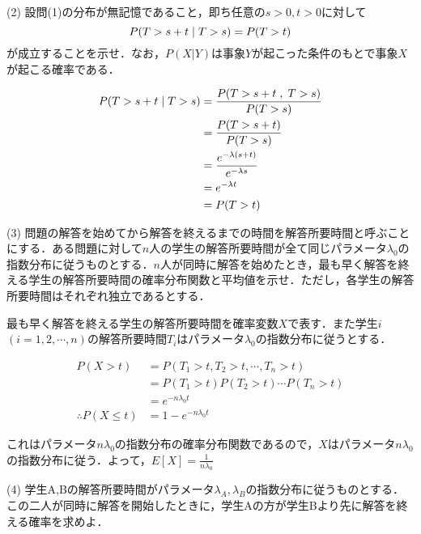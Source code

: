 \documentclass[a4j]{jarticle}
\let \ds \displaystyle
\begin{document}
\begin{screen}
 (2) 設問(1)の分布が無記憶であること，即ち任意の$s>0,t>0$に対して
 $$P(T>s+t \hspace{1mm}|\hspace{1mm} T>s ) = P(T>t)$$
 が成立することを示せ．なお，$P(X|Y)$は事象$Y$が起こった条件のもとで事象$X$が起こる確率である．
\end{screen}

\begin{align*}
 P(T>s+t \hspace{1mm}|\hspace{1mm} T>s ) &= \frac{P(T>s+t \hspace{1mm},\hspace{1mm} T>s )}{P(T>s)} \\
 &= \frac{P(T>s+t)}{P(T>s)} \\
 &= \frac{e^{-\lambda(s+t)}}{e^{-\lambda s}} \\
 &= e^{-\lambda t} \\
 &= P(T>t)
\end{align*}

\begin{screen}
 (3) 問題の解答を始めてから解答を終えるまでの時間を解答所要時間と呼ぶことにする．ある問題に対して$n$人の学生の解答所要時間が全て同じパラメータ$\lambda_0$の指数分布に従うものとする．$n$人が同時に解答を始めたとき，最も早く解答を終える学生の解答所要時間の確率分布関数と平均値を示せ．ただし，各学生の解答所要時間はそれぞれ独立であるとする．
\end{screen}

最も早く解答を終える学生の解答所要時間を確率変数$X$で表す．また学生$i$ $(i=1,2,\cdots,n)$の解答所要時間$T_i$はパラメータ$\lambda_0$の指数分布に従うとする．

\begin{align*}
 P(X > t) &= P(T_1 > t , T_2 > t , \cdots , T_{n} > t) \\
 &= P(T_1 > t)P(T_2 > t)\cdots P(T_{n} > t) \\
 &= e^{-n\lambda_0t} \\
 \therefore P(X \leq t)&=1-e^{-n\lambda_0t}
\end{align*}

これはパラメータ$n\lambda_0$の指数分布の確率分布関数であるので，$X$はパラメータ$n\lambda_0$の指数分布に従う．よって，$\ds E[X]=\frac{1}{n\lambda_0}$

\begin{screen}
 (4) 学生A,Bの解答所要時間がパラメータ$\lambda_A,\lambda_B$の指数分布に従うものとする．この二人が同時に解答を開始したときに，学生Aの方が学生Bより先に解答を終える確率を求めよ．
\end{screen}
\end{document}
